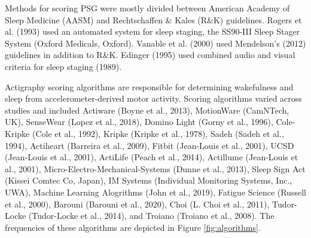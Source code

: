 \documentclass[
]{article}
\begin{document}
Methods for scoring PSG were mostly divided between American Academy of Sleep Medicine (AASM) and Rechtschaffen \& Kales (R\&K) guidelines. Rogers et al. (1993) used an automated system for sleep staging, the SS90-III Sleep Stager System (Oxford Medicals, Oxford). Vanable et al. (2000) used Mendelson's (2012) guidelines in addition to R\&K. Edinger (1995) used combined audio and visual criteria for sleep staging (1989).











































Actigraphy scoring algorithms are responsible for determining wakefulness and sleep from accelerometer-derived motor activity. Scoring algorithms varied across studies and included Actiware (Boyne et al., 2013), MotionWare (CamNTech, UK), SenseWear (Lopez et al., 2018), Domino Light (Gorny et al., 1996), Cole-Kripke (Cole et al., 1992), Kripke (Kripke et al., 1978), Sadeh (Sadeh et al., 1994), Actiheart (Barreira et al., 2009), Fitbit (Jean-Louis et al., 2001), UCSD (Jean-Louis et al., 2001), ActiLife (Peach et al., 2014), Actillume (Jean-Louis et al., 2001), Micro-Electro-Mechanical-Systems (Dunne et al., 2013), Sleep Sign Act (Kissei Comtec Co, Japan), IM Systems (Individual Monitoring Systems, Inc., UWA), Machine Learning Alogrithms (John et al., 2019), Fatigue Science (Russell et al., 2000), Barouni (Barouni et al., 2020), Choi (L. Choi et al., 2011), Tudor-Locke (Tudor-Locke et al., 2014), and Troiano (Troiano et al., 2008). The frequencies of these algorithms are depicted in Figure \ref{fig:algorithms}.
\end{document}
